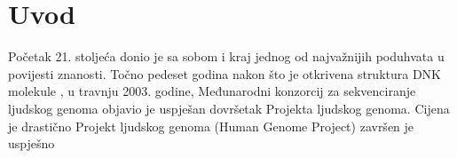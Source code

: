 \section*{Uvod}
\label{ch:intro}

Početak 21. stoljeća donio je sa sobom i kraj jednog od najvažnijih poduhvata u povijesti znanosti. Točno pedeset godina nakon što je otkrivena struktura DNK molekule \cite{Watson01}, u travnju 2003. godine, Međunarodni konzorcij za sekvenciranje ljudskog genoma objavio je uspješan dovršetak Projekta ljudskog genoma. Cijena je drastično 
Projekt ljudskog genoma (Human Genome Project)  završen je uspješno

